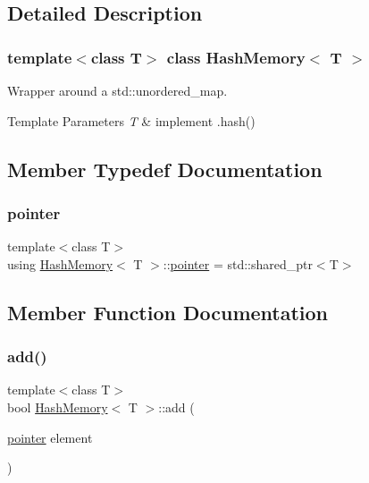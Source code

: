 \subsection{Detailed Description}
\subsubsection*{template$<$class T$>$\newline
class Hash\+Memory$<$ T $>$}

Wrapper around a std\+::unordered\+\_\+map. 


\begin{DoxyTemplParams}{Template Parameters}
{\em T} & implement .hash() \\
\hline
\end{DoxyTemplParams}


\subsection{Member Typedef Documentation}
\mbox{\label{classHashMemory_ab2c7ace63d7bbcf75d523c445a3a0dbb}} 
\subsubsection{\texorpdfstring{pointer}{pointer}}
{\footnotesize\ttfamily template$<$class T$>$ \\
using \mbox{\hyperlink{classHashMemory}{Hash\+Memory}}$<$ T $>$\+::\mbox{\hyperlink{classHashMemory_ab2c7ace63d7bbcf75d523c445a3a0dbb}{pointer}} =  std\+::shared\+\_\+ptr$<$T$>$}



\subsection{Member Function Documentation}
\mbox{\label{classHashMemory_aa1f2e179dc50cee47891064bbb82f2c9}} 
\subsubsection{\texorpdfstring{add()}{add()}}
{\footnotesize\ttfamily template$<$class T$>$ \\
bool \mbox{\hyperlink{classHashMemory}{Hash\+Memory}}$<$ T $>$\+::add (\begin{DoxyParamCaption}\item[{\mbox{\hyperlink{classHashMemory_ab2c7ace63d7bbcf75d523c445a3a0dbb}{pointer}}}]{element }\end{DoxyParamCaption})\hspace{0.3cm}{\ttfamily [inline]}}



